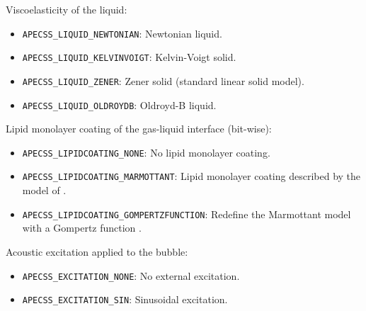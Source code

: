 Viscoelasticity of the liquid:\vspace{-1em}
\begin{itemize}[noitemsep]
  \item {\tt APECSS\_LIQUID\_NEWTONIAN}: Newtonian liquid.
  \item {\tt APECSS\_LIQUID\_KELVINVOIGT}: Kelvin-Voigt solid.
  \item {\tt APECSS\_LIQUID\_ZENER}: Zener solid (standard linear solid model).
  \item {\tt APECSS\_LIQUID\_OLDROYDB}: Oldroyd-B liquid.
\end{itemize}

Lipid monolayer coating of the gas-liquid interface (bit-wise):\vspace{-1em}
\begin{itemize}[noitemsep]
  \item {\tt APECSS\_LIPIDCOATING\_NONE}: No lipid monolayer coating.
  \item {\tt APECSS\_LIPIDCOATING\_MARMOTTANT}: Lipid monolayer coating described by the model of \citet{Marmottant2005}.
  \item {\tt APECSS\_LIPIDCOATING\_GOMPERTZFUNCTION}: Redefine the Marmottant model with a Gompertz function \citep{Guemmer2021}.
\end{itemize}

Acoustic excitation applied to the bubble:\vspace{-1em}
\begin{itemize}[noitemsep]
  \item {\tt APECSS\_EXCITATION\_NONE}: No external excitation. 
  \item {\tt APECSS\_EXCITATION\_SIN}: Sinusoidal excitation.
\end{itemize}

